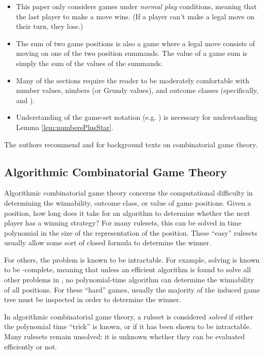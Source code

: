 \documentclass[letter,10pt]{article}
\begin{document}
\begin{itemize}
    \item  This paper only considers games under \emph{normal play} conditions, meaning that the last player to make a move wins.  (If a player can't make a legal move on their turn, they lose.)
    \item  The sum of two game positions is also a game where a legal move consists of moving on one of the two position summands.  The value of a game sum is simply the sum of the values of the summands.
    \item  Many of the sections require the reader to be moderately comfortable with number values, nimbers (or Grundy values), and outcome classes (specifically,  and ).
    \item Understanding of the game-set notation (e.g. ) is necessary for understanding Lemma \ref{lem:numbersPlusStar}.
\end{itemize}

The authors recommend \cite{LessonsInPlay:2007} and \cite{WinningWays:2001} for background texts on combinatorial game theory.

\subsection{Algorithmic Combinatorial Game Theory}

Algorithmic combinatorial game theory concerns the computational difficulty in determining the winnability, outcome class, or value of game positions.  Given a position, how long does it take for an algorithm to determine whether the next player has a winning strategy?  For many rulesets, this can be solved in time polynomial in the size of the representation of the position.  These ``easy'' rulesets usually allow some sort of closed formula to determine the winner.

For others, the problem is known to be intractable.  For example, solving  is known to be -complete\cite{DBLP:journals/jcss/Schaefer78}, meaning that unless an efficient algorithm is found to solve all other problems in , no polynomial-time algorithm can determine the winnability of all  positions.  For these ``hard'' games, usually the majority of the induced game tree must be inspected in order to determine the winner.

In algorithmic combinatorial game theory, a ruleset is considered \emph{solved} if either the polynomial time ``trick'' is known, or if it has been shown to be intractable.  Many rulesets remain unsolved: it is unknown whether they can be evaluated efficiently or not.
\end{document}
